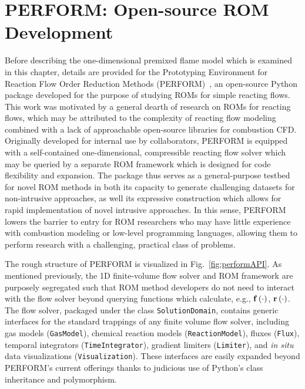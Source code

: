 \section{PERFORM: Open-source ROM Development}

Before describing the one-dimensional premixed flame model which is examined in this chapter, details are provided for the Prototyping Environment for Reaction Flow Order Reduction Methods (PERFORM)~\cite{Wentland2022}, an open-source Python package developed for the purpose of studying ROMs for simple reacting flows. This work was motivated by a general dearth of research on ROMs for reacting flows, which may be attributed to the complexity of reacting flow modeling combined with a lack of approachable open-source libraries for combustion CFD. Originally developed for internal use by collaborators, PERFORM is equipped with a self-contained one-dimensional, compressible reacting flow solver which may be queried by a separate ROM framework which is designed for code flexibility and expansion. The package thus serves as a general-purpose testbed for novel ROM methods in both its capacity to generate challenging datasets for non-intrusive approaches, as well its expressive construction which allows for rapid implementation of novel intrusive approaches.  In this sense, PERFORM lowers the barrier to entry for ROM researchers who may have little experience with combustion modeling or low-level programming languages, allowing them to perform research with a challenging, practical class of problems.

The rough structure of PERFORM is visualized in Fig.~\ref{fig:performAPI}. As mentioned previously, the 1D finite-volume flow solver and ROM framework are purposely segregated such that ROM method developers do not need to interact with the flow solver beyond querying functions which calculate, e.g., $\mathbf{f} \left(\cdot\right)$, $\mathbf{r}\left(\cdot\right)$. The flow solver, packaged under the class \texttt{SolutionDomain}, contains generic interfaces for the standard trappings of any finite volume flow solver, including gas models (\texttt{GasModel}), chemical reaction models (\texttt{ReactionModel}), fluxes (\texttt{Flux}), temporal integrators (\texttt{TimeIntegrator}), gradient limiters (\texttt{Limiter}), and \textit{in situ} data visualizations (\texttt{Visualization}). These interfaces are easily expanded beyond PERFORM's current offerings thanks to judicious use of Python's class inheritance and polymorphism.

